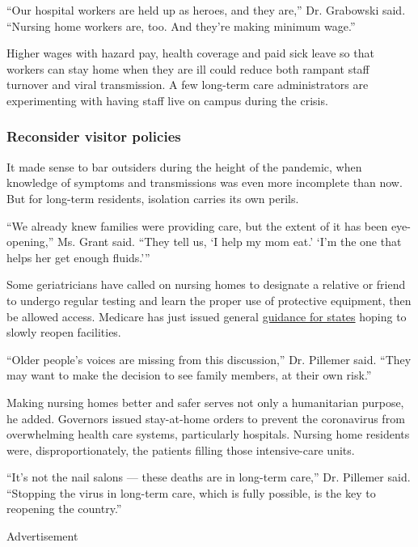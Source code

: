 ``Our hospital workers are held up as heroes, and they are,'' Dr.
Grabowski said. ``Nursing home workers are, too. And they're making
minimum wage.''

Higher wages with hazard pay, health coverage and paid sick leave so
that workers can stay home when they are ill could reduce both rampant
staff turnover and viral transmission. A few long-term care
administrators are experimenting with having staff live on campus during
the crisis.

\hypertarget{reconsider-visitor-policies}{%
\subsubsection{\texorpdfstring{\textbf{Reconsider visitor
policies}}{Reconsider visitor policies}}\label{reconsider-visitor-policies}}

It made sense to bar outsiders during the height of the pandemic, when
knowledge of symptoms and transmissions was even more incomplete than
now. But for long-term residents, isolation carries its own perils.

``We already knew families were providing care, but the extent of it has
been eye-opening,'' Ms. Grant said. ``They tell us, `I help my mom eat.'
`I'm the one that helps her get enough fluids.'''

Some geriatricians have called on nursing homes to designate a relative
or friend to undergo regular testing and learn the proper use of
protective equipment, then be allowed access. Medicare has just issued
general
\href{https://www.cms.gov/files/document/nursing-home-reopening-recommendations-state-and-local-officials.pdf}{guidance
for states} hoping to slowly reopen facilities.

``Older people's voices are missing from this discussion,'' Dr. Pillemer
said. ``They may want to make the decision to see family members, at
their own risk.''

Making nursing homes better and safer serves not only a humanitarian
purpose, he added. Governors issued stay-at-home orders to prevent the
coronavirus from overwhelming health care systems, particularly
hospitals. Nursing home residents were, disproportionately, the patients
filling those intensive-care units.

``It's not the nail salons --- these deaths are in long-term care,'' Dr.
Pillemer said. ``Stopping the virus in long-term care, which is fully
possible, is the key to reopening the country.''

Advertisement

